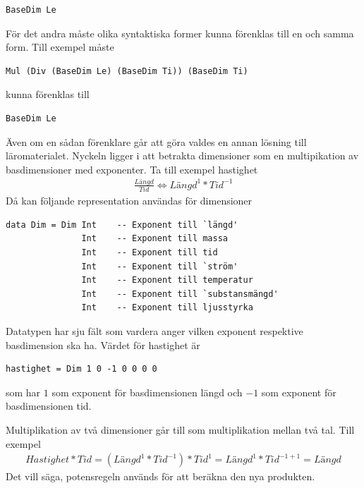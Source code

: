 \begin{draft}
\begin{lstlisting}[frame=none, belowskip=-0.5\baselineskip, xleftmargin=0.5in]
BaseDim Le
\end{lstlisting}

För det andra måste olika syntaktiska former kunna förenklas till en och samma
form. Till exempel måste

\begin{lstlisting}[frame=none, belowskip=-0.5\baselineskip, xleftmargin=0.5in]
Mul (Div (BaseDim Le) (BaseDim Ti)) (BaseDim Ti)
\end{lstlisting}

kunna förenklas till

\begin{lstlisting}[frame=none, belowskip=-0.5\baselineskip, xleftmargin=0.5in]
BaseDim Le
\end{lstlisting}

Även om en sådan förenklare går att göra valdes en annan lösning till
läromaterialet. Nyckeln ligger i att betrakta dimensioner som en multipikation
av basdimensioner med exponenter. Ta till exempel hastighet
\begin{align*}
  \frac{Längd}{Tid} \iff Längd^1 * Tid^{-1}
\end{align*}
Då kan följande representation användas för dimensioner

\begin{lstlisting}[frame=none, belowskip=-0.5\baselineskip, xleftmargin=0.5in]
data Dim = Dim Int    -- Exponent till `längd'
               Int    -- Exponent till massa
               Int    -- Exponent till tid
               Int    -- Exponent till `ström'
               Int    -- Exponent till temperatur
               Int    -- Exponent till `substansmängd'
               Int    -- Exponent till ljusstyrka
\end{lstlisting}

Datatypen har sju fält som vardera anger vilken exponent respektive
basdimension ska ha. Värdet för hastighet är

\begin{lstlisting}[frame=none, belowskip=-0.5\baselineskip, xleftmargin=0.5in]
hastighet = Dim 1 0 -1 0 0 0 0
\end{lstlisting}

som har $1$ som exponent för basdimensionen längd och $-1$ som exponent för
basdimensionen tid.

Multiplikation av två dimensioner går till som multiplikation mellan två tal.
Till exempel \begin{align*}
  Hastighet * Tid = (Längd^1 * Tid^{-1}) * Tid^1 = Längd^1 * Tid^{-1 + 1} =
  Längd \end{align*}
Det vill säga, potensregeln används för att beräkna den nya produkten.


\end{draft}
